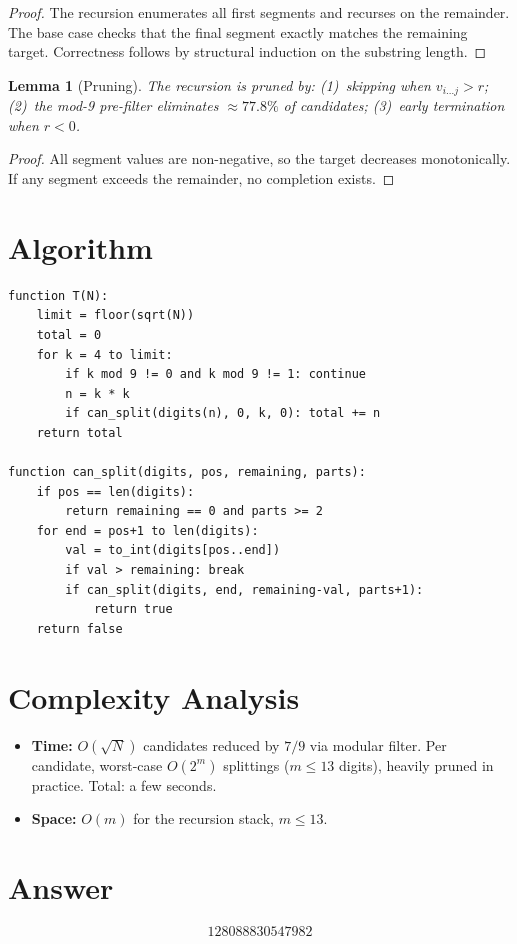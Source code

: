 \documentclass[11pt]{article}
\newtheorem{lemma}[theorem]{Lemma}
\begin{document}
\begin{proof}
The recursion enumerates all first segments and recurses on the remainder. The base case checks that the final segment exactly matches the remaining target. Correctness follows by structural induction on the substring length.
\end{proof}

\begin{lemma}[Pruning]
The recursion is pruned by: (1)~skipping when $v_{i\ldots j} > r$; (2)~the mod-9 pre-filter eliminates ${\approx}77.8\%$ of candidates; (3)~early termination when $r < 0$.
\end{lemma}

\begin{proof}
All segment values are non-negative, so the target decreases monotonically. If any segment exceeds the remainder, no completion exists.
\end{proof}

\section{Algorithm}

\begin{verbatim}
function T(N):
    limit = floor(sqrt(N))
    total = 0
    for k = 4 to limit:
        if k mod 9 != 0 and k mod 9 != 1: continue
        n = k * k
        if can_split(digits(n), 0, k, 0): total += n
    return total

function can_split(digits, pos, remaining, parts):
    if pos == len(digits):
        return remaining == 0 and parts >= 2
    for end = pos+1 to len(digits):
        val = to_int(digits[pos..end])
        if val > remaining: break
        if can_split(digits, end, remaining-val, parts+1):
            return true
    return false
\end{verbatim}

\section{Complexity Analysis}

\begin{itemize}
    \item \textbf{Time:} $O(\sqrt{N})$ candidates reduced by $7/9$ via modular filter. Per candidate, worst-case $O(2^m)$ splittings ($m \le 13$ digits), heavily pruned in practice. Total: a few seconds.
    \item \textbf{Space:} $O(m)$ for the recursion stack, $m \le 13$.
\end{itemize}

\section{Answer}

\[
\boxed{128088830547982}
\]
\end{document}
